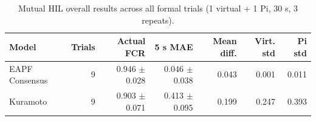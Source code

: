 \begin{table}[htbp]
\centering
\footnotesize
\caption{Mutual HIL overall results across all formal trials (1 virtual + 1 Pi, 30 s, 3 repeats).}
\label{tab:overall}
\begin{tabular}{@{}lrrrrrr@{}}
\toprule
\textbf{Model} & \textbf{Trials} & \textbf{Actual FCR} & \textbf{5 s MAE} & \textbf{Mean diff.} & \textbf{Virt. std} & \textbf{Pi std} \\
\midrule
EAPF Consensus & 9 & 0.946 $\pm$ 0.028 & 0.046 $\pm$ 0.038 & 0.043 & 0.001 & 0.011 \\
Kuramoto & 9 & 0.903 $\pm$ 0.071 & 0.413 $\pm$ 0.095 & 0.199 & 0.247 & 0.393 \\
\bottomrule
\end{tabular}
\end{table}
